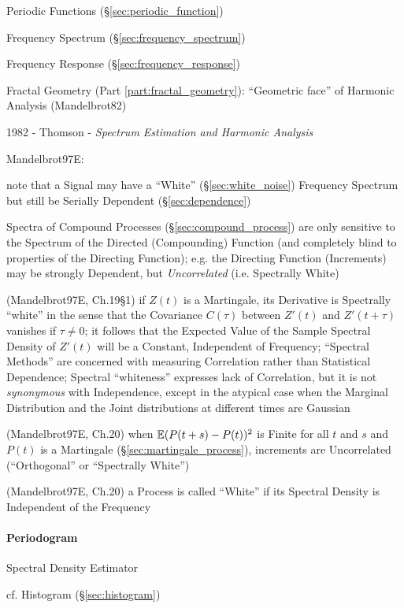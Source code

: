 Periodic Functions (\S\ref{sec:periodic_function})

Frequency Spectrum (\S\ref{sec:frequency_spectrum})

\fist Frequency Response (\S\ref{sec:frequency_response})

\fist Fractal Geometry (Part \ref{part:fractal_geometry}): ``Geometric face'' of
Harmonic Analysis (Mandelbrot82)

1982 - Thomson - \emph{Spectrum Estimation and Harmonic Analysis}

Mandelbrot97E:

note that a Signal may have a ``White'' (\S\ref{sec:white_noise}) Frequency
Spectrum but still be Serially Dependent (\S\ref{sec:dependence})

Spectra of Compound Processes (\S\ref{sec:compound_process}) are only sensitive
to the Spectrum of the Directed (Compounding) Function (and completely blind to
properties of the Directing Function); e.g. the Directing Function (Increments)
may be strongly Dependent, but \emph{Uncorrelated} (i.e. Spectrally White)

(Mandelbrot97E, Ch.19\S 1) if $Z(t)$ is a Martingale, its Derivative is
Spectrally ``white'' in the sense that the Covariance $C(\tau)$ between $Z'(t)$
and $Z'(t + \tau)$ vanishes if $\tau \neq 0$; it follows that the Expected Value
of the Sample Spectral Density of $Z'(t)$ will be a Constant, Independent of
Frequency; ``Spectral Methods'' are concerned with measuring Correlation rather
than Statistical Dependence; Spectral ``whiteness'' expresses lack of
Correlation, but it is not \emph{synonymous} with Independence, except in the
atypical case when the Marginal Distribution and the Joint distributions at
different times are Gaussian

(Mandelbrot97E, Ch.20) when $\mathbb{E}(P(t+s) - P(t))^2$ is Finite for all $t$ and
$s$ and $P(t)$ is a Martingale (\S\ref{sec:martingale_process}), increments are
Uncorrelated (``Orthogonal'' or ``Spectrally White'')

(Mandelbrot97E, Ch.20) a Process is called ``White'' if its Spectral Density is
Independent of the Frequency



\paragraph{Periodogram}\label{sec:periodogram}\hfill

Spectral Density Estimator

cf. Histogram (\S\ref{sec:histogram})



